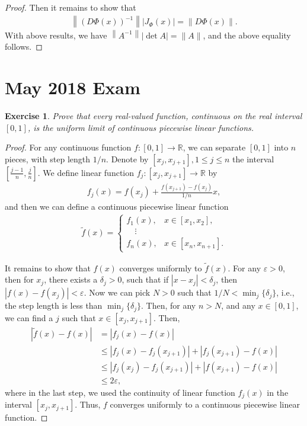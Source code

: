 \documentclass[11pt]{article}
\newtheorem{exercise}{Exercise}[section]
\theoremstyle{definition}
\numberwithin{equation}{subsection}
\begin{document}
\begin{proof}
Then it remains to show that 
\begin{align*}
    \left\|\left(D\Phi(x)\right)^{-1} \right\| \left|J_\Phi(x)\right| = \left\|D\Phi(x) \right\|.
\end{align*}
With above results, we have $\left\|A^{-1}\right\| |\det A|= \|A\|$, and the above equality follows.
\end{proof}


\newpage

\section{May 2018 Exam}


\begin{exercise}
Prove that every real-valued function, continuous on the real interval $[0,1]$, is the uniform limit of continuous piecewise linear functions.
\end{exercise}
\begin{proof}
For any continuous function $f:[0,1] \to \mathbb{R}$, we can separate $[0,1]$ into $n$ pieces, with step length $1/n$. Denote by $[x_j, x_{j+1}], 1 \leq j \leq n$ the interval $\left[\frac{j-1}{n}, \frac{j}{n}\right]$. We define linear function $f_j: [x_j, x_{j+1}] \to \mathbb{R}$ by
\begin{align*}
    f_j(x) = f(x_j) + \frac{f(x_{j+1}) - f(x_j)}{1/n} x,
\end{align*}
and then we can define a continuous piecewise linear function
\begin{align*}
    \widetilde{f}(x) = \begin{cases}
        f_1(x), & x \in [x_1, x_2], \\
        \quad \vdots \\
        f_n(x), & x \in [x_n, x_{n+1}].
    \end{cases}
\end{align*}

It remains to show that $f(x)$ converges uniformly to $\widetilde{f}(x)$. For any $\varepsilon > 0$, then for $x_j$, there exists a $\delta_j > 0$, such that if $|x - x_j| < \delta_j$, then $|f(x) - f(x_j)| < \varepsilon$. Now we can pick $N > 0$ such that $1/N < \min_{j}\{\delta_j\}$, i.e., the step length is less than $\min_{j}\{\delta_j\}$. Then, for any $n > N$, and any $x \in [0,1]$, we can find a $j$ such that $x \in [x_j, x_{j+1}]$. Then,
\begin{align*}
    \left|\widetilde{f}(x) - f(x)\right| & = \left|f_j(x) - f(x)\right| \\
    & \leq \left|f_j(x) -  f_j(x_{j+1})\right| + \left|f_j(x_{j+1}) - f(x)\right| \\
    & \leq \left|f_j(x_j) -  f_j(x_{j+1})\right| + \left|f(x_{j+1}) - f(x)\right| \\
    & \leq 2 \varepsilon,
\end{align*}
where in the last step, we used the continuity of linear function $f_j(x)$ in the interval $[x_j, x_{j+1}]$. Thus, $f$ converges uniformly to a continuous piecewise linear function.
\end{proof}
\end{document}
